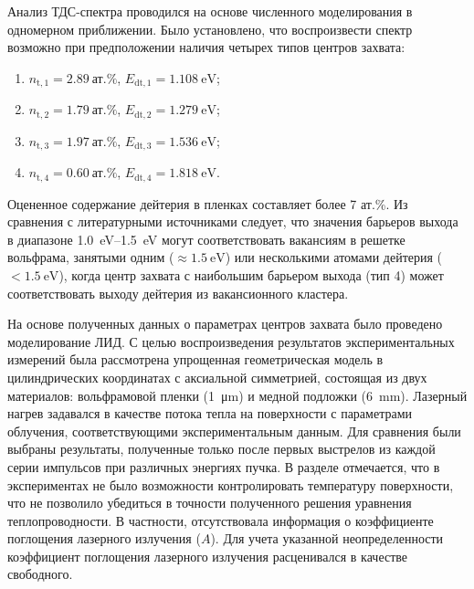 Анализ ТДС-спектра проводился на основе численного моделирования в одномерном приближении. Было установлено, что воспроизвести спектр возможно при предположении наличия четырех типов центров захвата:
\begin{enumerate}[beginpenalty=10000]
    \item \( n_\mathrm{t,1}=\SI{2.89}{\text{ат.}\percent} \), \( E_\mathrm{dt,1}=\SI{1.108}{\electronvolt} \);
    \item \( n_\mathrm{t,2}=\SI{1.79}{\text{ат.}\percent} \), \( E_\mathrm{dt,2}=\SI{1.279}{\electronvolt} \);
    \item \( n_\mathrm{t,3}=\SI{1.97}{\text{ат.}\percent} \), \( E_\mathrm{dt,3}=\SI{1.536}{\electronvolt} \);
    \item \( n_\mathrm{t,4}=\SI{0.60}{\text{ат.}\percent} \), \( E_\mathrm{dt,4}=\SI{1.818}{\electronvolt} \).
\end{enumerate}
Оцененное содержание дейтерия в пленках составляет более 7 ат.\%. Из сравнения с литературными источниками следует, что значения барьеров выхода в диапазоне \SIrange{1.0}{1.5}{\electronvolt} могут соответствовать вакансиям в решетке вольфрама, занятыми одним (\(\approx\SI{1.5}{\electronvolt}\)) или несколькими атомами дейтерия (\(<\SI{1.5}{\electronvolt}\)), когда центр захвата с наибольшим барьером выхода (тип 4) может соответствовать выходу дейтерия из вакансионного кластера. 

На основе полученных данных о параметрах центров захвата было проведено моделирование ЛИД. С целью воспроизведения результатов экспериментальных измерений была рассмотрена упрощенная геометрическая модель в цилиндрических координатах с аксиальной симметрией, состоящая из двух материалов: вольфрамовой пленки (\SI{1}{\micro\meter}) и медной подложки (\SI{6}{\milli\meter}). Лазерный нагрев задавался в качестве потока тепла на поверхности с параметрами облучения, соответствующими экспериментальным данным. Для сравнения были выбраны результаты, полученные только после первых выстрелов из каждой серии импульсов при различных энергиях пучка. В разделе отмечается, что в экспериментах не было возможности контролировать температуру поверхности, что не позволило убедиться в точности полученного решения уравнения теплопроводности. В частности, отсутствовала информация о коэффициенте поглощения лазерного излучения (\( A \)). Для учета указанной неопределенности коэффициент поглощения лазерного излучения расценивался в качестве свободного.

